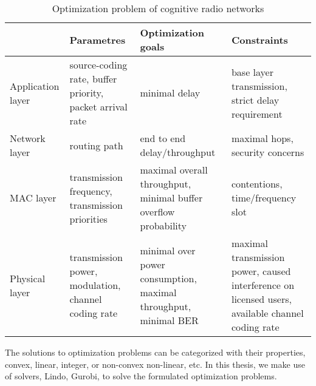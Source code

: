 \begin{table}
\begin{tabular}{|C{2.2cm}|C{3.8cm} | C{3.5cm} | C{3.7cm}|}
\hline 
 & Parametres & Optimization goals & Constraints \\ 
\hline 
Application layer & source-coding rate, buffer priority, packet arrival rate & minimal delay & base layer transmission, strict delay requirement \\ 
\hline 
Network layer & routing path & end to end delay/throughput & maximal hops, security concerns \\ 
\hline 
MAC layer & transmission frequency, transmission priorities & maximal overall throughput, minimal buffer overflow probability & contentions, time/frequency slot \\ 
\hline
Physical layer & transmission power, modulation, channel coding rate & minimal over power consumption, maximal throughput, minimal BER & maximal transmission power, caused interference on licensed users, available channel coding rate \\ 
\hline
\end{tabular} 
\caption{Optimization problem of cognitive radio networks}
\label{opt_table} 
\end{table}

The solutions to optimization problems can be categorized with their properties, \ie convex, linear, integer, or non-convex non-linear, etc.
In this thesis, we make use of solvers, \ie Lindo, Gurobi, to solve the formulated optimization problems.


